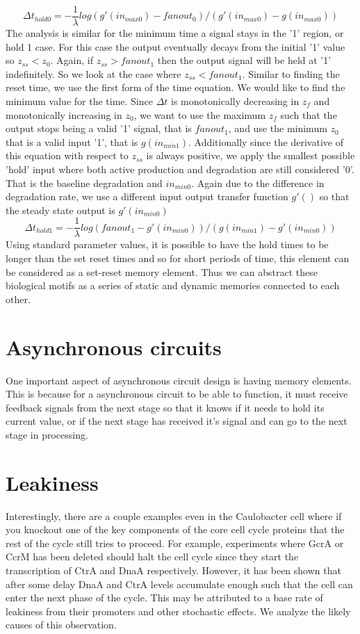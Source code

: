 \documentclass{article}
\begin{document}
\[\Delta t_{hold0}= -\frac{1}{\lambda} log(g'(in_{max0}) -fanout_0)/(g'(in_{max0}) -g(in_{max0}))				
\]
The analysis is similar for the minimum time a signal stays in the '1' region, or hold 1 case.  For this case the output eventually decays from the initial '1' value so $z_{ss}<z_0$. Again, if $z_{ss}>fanout_1$ then the output signal will be held at '1' indefinitely. So we look at the case where $z_{ss}<fanout_1$.  Similar to finding the reset time, we use the first form of the time equation.   We would like to find the minimum value for the time.  Since $\Delta t$ is monotonically decreasing in $z_f$ and monotonically increasing in $z_0$, we want to use the maximum $z_f$ such that the output stops being a valid '1' signal, that is $fanout_1$, and use the minimum $z_0$ that is a valid input '1', that is $g(in_{min1})$.  Additionally since the derivative of this equation with respect to $z_{ss}$ is always positive, we apply the smallest possible 'hold' input where both active production and degradation are still considered '0'.  That is the baseline degradation and $in_{min0}$.  Again due to the difference in degradation rate, we use a different input output transfer function $g'()$ so that the steady state output is $g'(in_{min0})$  
\[\Delta t_{hold1}= -\frac{1}{\lambda} log(fanout_1 -g'(in_{min0}))/(g(in_{min1}) -g'(in_{min0}))
\]
Using standard parameter values, it is possible to have the hold times to be longer than the set reset times and so for short periods of time, this element can be considered as a set-reset memory element.  Thus we can abstract these biological motifs as a series of static and dynamic memories connected to each other.

\section{Asynchronous circuits}
One important aspect of asynchronous circuit design is having memory elements.  This is because for a asynchronous circuit to be able to function, it must receive feedback signals from the next stage so that it knows if it needs to hold its current value, or if the next stage has received it's signal and can go to the next stage in processing.

\section{Leakiness}
Interestingly, there are a couple examples even in the Caulobacter cell where if you knockout one of the key components of the core cell cycle proteins that the rest of the cycle still tries to proceed.  For example, experiments where GcrA or CcrM has been deleted should halt the cell cycle since they start the transcription of CtrA and DnaA respectively.  However, it has been shown that after some delay DnaA and CtrA levels accumulate enough such that the cell can enter the next phase of the cycle.  This may be attributed to a base rate of leakiness from their promoters and other stochastic effects.  We analyze the likely causes of this observation.
\end{document}
